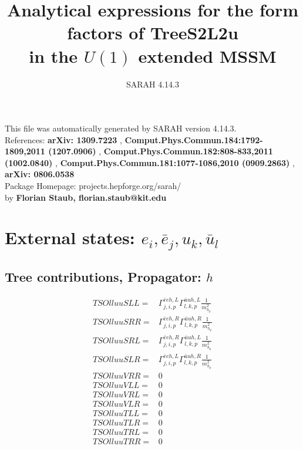 \documentclass[A4,landscape]{article}
\begin{document}
\title{Analytical expressions for the form factors of TreeS2L2u\\ in the $U(1)$ extended MSSM } 
 \author{SARAH 4.14.3} 
 \maketitle 
 \vspace{10cm} 
This file was automatically generated by SARAH version 4.14.3.  \\ 
References: {\bf arXiv: 1309.7223 }, {\bf Comput.Phys.Commun.184:1792-1809,2011 (1207.0906) }, {\bf Comput.Phys.Commun.182:808-833,2011 (1002.0840) }, {\bf Comput.Phys.Commun.181:1077-1086,2010 (0909.2863) }, {\bf arXiv: 0806.0538 } \\ 
Package Homepage: projects.hepforge.org/sarah/ \\ 
by {\bf Florian Staub, florian.staub@kit.edu} 
 \pagebreak 
 \tableofcontents 
 \pagebreak 
\section{External states: ${e_{{i}}, \bar{e}_{{j}}, u_{{k}}, \bar{u}_{{l}}}$} 
\subsection{Tree contributions, Propagator: $h$} 

\begin{align} 
  TSOlluuSLL= & \Gamma^{\bar{e}e h ,L}_{j, i, p} \Gamma^{\bar{u}u h ,L}_{l, k, p} \frac{1}{m^2_{h_{{p}}}} \\ 
  TSOlluuSRR= & \Gamma^{\bar{e}e h ,R}_{j, i, p} \Gamma^{\bar{u}u h ,R}_{l, k, p} \frac{1}{m^2_{h_{{p}}}} \\ 
  TSOlluuSRL= & \Gamma^{\bar{e}e h ,R}_{j, i, p} \Gamma^{\bar{u}u h ,L}_{l, k, p} \frac{1}{m^2_{h_{{p}}}} \\ 
  TSOlluuSLR= & \Gamma^{\bar{e}e h ,L}_{j, i, p} \Gamma^{\bar{u}u h ,R}_{l, k, p} \frac{1}{m^2_{h_{{p}}}} \\ 
  TSOlluuVRR= & 0 \\ 
  TSOlluuVLL= & 0 \\ 
  TSOlluuVRL= & 0 \\ 
  TSOlluuVLR= & 0 \\ 
  TSOlluuTLL= & 0 \\ 
  TSOlluuTLR= & 0 \\ 
  TSOlluuTRL= & 0 \\ 
  TSOlluuTRR= & 0 \\ 
\end{align} 
\end{document}
